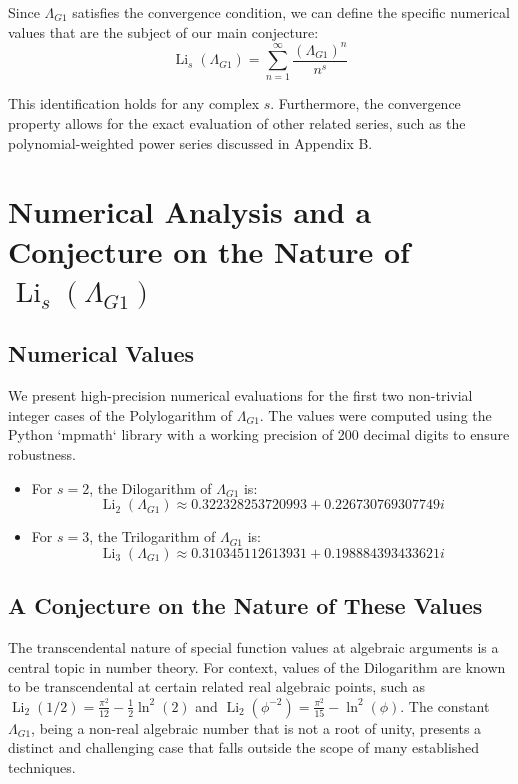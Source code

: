 \documentclass{amsart}
\theoremstyle{plain}
\theoremstyle{definition}
\theoremstyle{remark}
\DeclareMathOperator{\Li}{Li} %
\newcommand{\LambdaG}{\Lambda_{G1}}
\begin{document}
Since $\LambdaG$ satisfies the convergence condition, we can define the specific numerical values that are the subject of our main conjecture:
$$ \Li_s(\LambdaG) = \sum_{n=1}^{\infty} \frac{(\LambdaG)^{n}}{n^s} $$

This identification holds for any complex $s$. Furthermore, the convergence property allows for the exact evaluation of other related series, such as the polynomial-weighted power series discussed in Appendix B.

\section{Numerical Analysis and a Conjecture on the Nature of \texorpdfstring{$\Li_s(\LambdaG)$}{Li\_s(Lambda\_G1)}}

\subsection{Numerical Values}
We present high-precision numerical evaluations for the first two non-trivial integer cases of the Polylogarithm of $\LambdaG$. The values were computed using the Python `mpmath` library with a working precision of 200 decimal digits to ensure robustness.
\begin{itemize}
    \item For $s=2$, the Dilogarithm of $\LambdaG$ is:
    $$ \Li_2(\LambdaG) \approx 0.322328253720993 + 0.226730769307749i $$
    
    \item For $s=3$, the Trilogarithm of $\LambdaG$ is:
    $$ \Li_3(\LambdaG) \approx 0.310345112613931 + 0.198884393433621i $$
    
\end{itemize}

\subsection{A Conjecture on the Nature of These Values}
The transcendental nature of special function values at algebraic arguments is a central topic in number theory. For context, values of the Dilogarithm are known to be transcendental at certain related real algebraic points, such as $\Li_2(1/2) = \frac{\pi^2}{12} - \frac{1}{2}\ln^2(2)$ and $\Li_2(\phi^{-2}) = \frac{\pi^2}{15} - \ln^2(\phi)$. The constant $\LambdaG$, being a non-real algebraic number that is not a root of unity, presents a distinct and challenging case that falls outside the scope of many established techniques.
\end{document}
